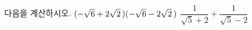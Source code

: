 다음을 계산하시오.
 $(-\sqrt{6}+2\sqrt{2}\mkern3mu )(-\sqrt{6}-2\sqrt{2}\mkern3mu )$
 $\dfrac{1}{\sqrt{5}+2}+\dfrac{1}{\sqrt{5}-2}$
